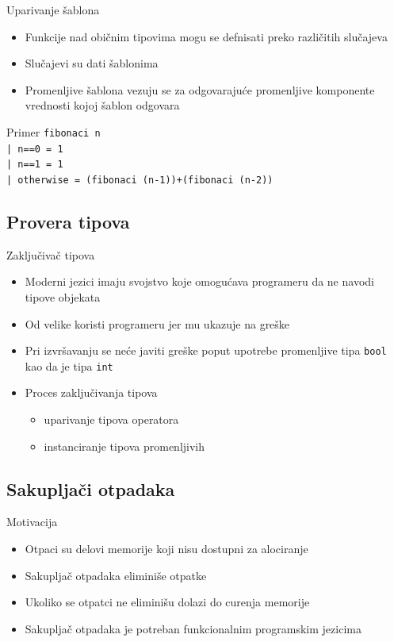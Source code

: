 \documentclass[xcolor={dvipsnames}, 11pt]{beamer}
\begin{document}
\begin{frame}{Uparivanje šablona}
	\begin{itemize}
		\item Funkcije nad običnim tipovima mogu se defnisati preko različitih slučajeva
		\item Slučajevi su dati šablonima
		\item Promenljive šablona vezuju se za odgovarajuće promenljive komponente vrednosti kojoj šablon odgovara
	\end{itemize}

	\begin{block}{Primer}
		\texttt{fibonaci n
                  \\ | n==0 = 1
                  \\ | n==1 = 1
                  \\ | otherwise = (fibonaci (n-1))+(fibonaci (n-2))}
	\end{block}

\end{frame}


\subsection{Provera tipova}

\begin{frame}{Zaključivač tipova}
	
	\begin{itemize}
		\item Moderni jezici imaju svojstvo koje omogućava programeru da ne navodi tipove objekata
		\item Od velike koristi programeru jer mu ukazuje na greške
		\item Pri izvršavanju se neće javiti greške poput upotrebe promenljive tipa \texttt{bool} kao da je tipa \texttt{int}
		\item Proces zaključivanja tipova
		\begin{itemize}
			\item uparivanje tipova operatora
			\item instanciranje tipova promenljivih
		\end{itemize}
	\end{itemize}
	
\end{frame}


\subsection{Sakupljači otpadaka}
\begin{frame}{Motivacija}
	\begin{itemize}
		\item Otpaci su delovi memorije koji nisu dostupni za alociranje
		\item Sakupljač otpadaka eliminiše otpatke
		\item Ukoliko se otpatci ne eliminišu dolazi do curenja memorije
		\item Sakupljač otpadaka je potreban funkcionalnim programskim jezicima
	\end{itemize}
\end{frame}
\end{document}

